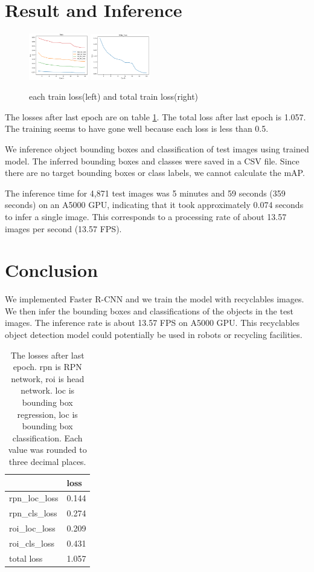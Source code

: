 \documentclass[extendedabs]{bmvc2k}
\begin{document}
\section{Result and Inference}
\begin{figure}[thb] \centering
    \includegraphics[width=0.23\textwidth]{images/train loss.PNG}
    \includegraphics[width=0.23\textwidth]{images/total loss.PNG}
    \caption{each train loss(left) and total train loss(right)} \label{fig:figure2}
\end{figure}
The losses after last epoch are on table \ref{tab:losstable}. The total loss after last epoch is 1.057. The training seems to have gone well because each loss is less than 0.5.

We inference object bounding boxes and classification of test images using trained model. The inferred bounding boxes and classes were saved in a CSV file. Since there are no target bounding boxes or class labels, we cannot calculate the mAP.

The inference time for 4,871 test images was 5 minutes and 59 seconds (359 seconds) on an A5000 GPU, indicating that it took approximately 0.074 seconds to infer a single image. This corresponds to a processing rate of about 13.57 images per second (13.57 FPS).

\section{Conclusion}
We implemented Faster R-CNN\cite{fasterrcnn} and we train the model with recyclables images. We then infer the bounding boxes and classifications of the objects in the test images. The inference rate is about 13.57 FPS on A5000 GPU. This recyclables object detection model could potentially be used in robots or recycling facilities.

\begin{table}[]
\centering
\begin{tabular}{|l|l|}
\hline
               & loss  \\ \hline
rpn\_loc\_loss & 0.144 \\ \hline
rpn\_cls\_loss & 0.274 \\ \hline
roi\_loc\_loss & 0.209 \\ \hline
roi\_cls\_loss & 0.431 \\ \hline
total loss     & 1.057 \\ \hline
\end{tabular}
\caption{The losses after last epoch. rpn is RPN network, roi is head network. loc is bounding box regression, loc is bounding box classification. Each value was rounded to three decimal places.}
\label{tab:losstable}
\end{table}
\newpage

\end{document}
